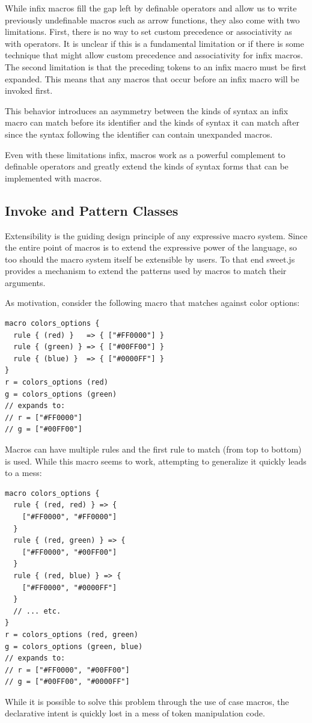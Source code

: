 \documentclass[preprint,10pt]{sigplanconf}
\begin{document}
While infix macros fill the gap left by definable operators and allow
us to write previously undefinable macros such as arrow functions,
they also come with two limitations. First, there is no way to set
custom precedence or associativity as with operators. It is unclear
if this is a fundamental limitation or if there is some technique that
might allow custom precedence and associativity for infix macros.
The second limitation is that the preceding tokens to an infix macro
must be first expanded. This means that any macros that occur before
an infix macro will be invoked first.

This behavior introduces an asymmetry between the kinds of syntax an
infix macro can match before its identifier and the kinds of syntax it
can match after since the syntax following the identifier can contain
unexpanded macros.

Even with these limitations infix, macros work as a powerful complement
to definable operators and greatly extend the kinds of syntax forms
that can be implemented with macros.

\subsection{Invoke and Pattern Classes}
\label{sec:invoke}

Extensibility is the guiding design principle of any expressive macro
system. Since the entire point of macros is to extend the expressive
power of the language, so too should the macro system itself be
extensible by users. To that end sweet.js provides a mechanism to
extend the patterns used by macros to match their arguments.

As motivation, consider the following macro that matches against
color options:
\begin{lstlisting}
macro colors_options {
  rule { (red) }   => { ["#FF0000"] }
  rule { (green) } => { ["#00FF00"] }
  rule { (blue) }  => { ["#0000FF"] }
}
r = colors_options (red)
g = colors_options (green)
// expands to:
// r = ["#FF0000"]
// g = ["#00FF00"]
\end{lstlisting}
Macros can have multiple rules and the first rule to match (from top
to bottom) is used. While this macro seems to work, attempting to
generalize it quickly leads to a mess:
\begin{lstlisting}
macro colors_options {
  rule { (red, red) } => {
    ["#FF0000", "#FF0000"]
  }
  rule { (red, green) } => {
    ["#FF0000", "#00FF00"]
  }
  rule { (red, blue) } => {
    ["#FF0000", "#0000FF"]
  }
  // ... etc.
}
r = colors_options (red, green)
g = colors_options (green, blue)
// expands to:
// r = ["#FF0000", "#00FF00"]
// g = ["#00FF00", "#0000FF"]
\end{lstlisting}
While it is possible to solve this problem through the use of case
macros, the declarative intent is quickly lost in a mess of 
token manipulation code.
\end{document}
